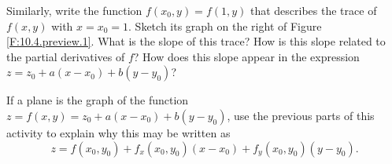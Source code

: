\begin{pa}
  \item Similarly, write the function $f(x_0, y) = f(1,y)$ that describes the
    trace of $f(x,y)$ with $x=x_0=1$.  Sketch its graph on the right of
    Figure \ref{F:10.4.preview.1}.  What is the slope of this trace?
    How is this slope related to the partial derivatives of $f$?  How
    does this slope appear in the expression $z=z_0 + a(x-x_0) +
    b(y-y_0)$? 

  \item If a plane is the graph of the function $z = f(x,y) = z_0 +
    a(x-x_0) + b(y-y_0)$, use the previous parts of this activity to
    explain why this may be written as 
    $$
    z = f(x_0, y_0) + f_x(x_0,y_0)(x-x_0) + f_y(x_0,y_0)(y-y_0).
    $$

  \ea



\end{pa} \afterpa 